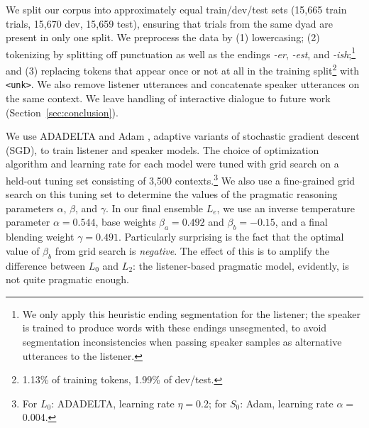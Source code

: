 \documentclass[11pt,letterpaper]{article}
\newcommand{\word}{\textit}
\newcommand{\Listener}{L}
\newcommand{\Speaker}{S}
\renewcommand{\|}{\mid}
\newcommand{\secref}[1]{Section~\ref{#1}}
\newcommand{\todocheck}[1]{\textcolor{red}{#1}}
\begin{document}
We split our corpus into approximately equal train/dev/test sets
(15,665 train trials, 15,670 dev, 15,659 test), ensuring that trials from
the same dyad are present in only one split. 
We preprocess the data by (1) lowercasing; (2) tokenizing
by splitting off punctuation as well as the endings \word{\mbox{-er}}, \word{\mbox{-est}}, and
\word{\mbox{-ish}};\footnote{We
only apply this heuristic ending segmentation for the listener; the speaker is trained to produce
words with these endings unsegmented, to avoid segmentation inconsistencies
when passing speaker samples as alternative utterances to the listener.} and
(3) replacing tokens that appear once or not at all
in the training split\footnote{1.13\% of training tokens, 1.99\% of dev/test.} with \texttt{<unk>}. We also remove
listener utterances and concatenate speaker utterances on the same context. 
We leave handling of interactive dialogue to future work (\secref{sec:conclusion}).

We use ADADELTA
\cite{Zeiler2012} and Adam \cite{Kingma2014}, adaptive variants of
stochastic gradient descent (SGD), to train listener and speaker models.
The choice of optimization
algorithm and learning rate for each model were tuned with grid search
on a held-out tuning set consisting of 3,500 contexts.\footnote{For
  $\Listener_0$: ADADELTA, learning rate $\eta = {}$0.2; for
  $\Speaker_0$: Adam, learning rate $\alpha = {}$0.004.}
We also use a fine-grained grid search on this tuning set to determine the
values of the pragmatic reasoning parameters $\alpha$, $\beta$, and $\gamma$.
In our final ensemble $\Listener_e$, we use an inverse temperature parameter
$\alpha = 0.544$, base weights $\beta_a = 0.492$ and $\beta_b = -0.15$, and
a final blending weight $\gamma = 0.491$.
Particularly surprising is the fact that the optimal value of $\beta_b$
from grid search is \emph{negative}. The effect of this is to amplify
the difference between $\Listener_0$ and $\Listener_2$: the listener-based
pragmatic model, evidently, is not quite pragmatic enough.
\end{document}
